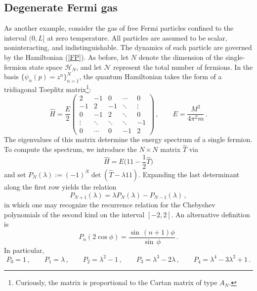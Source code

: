 \documentclass[12pt,a4paper]{article}
\numberwithin{equation}{section}
\theoremstyle{theorem}
\theoremstyle{remark}
\newcommand{\hn}{\mathcal{H}_N}
\newcommand{\I}{1\!\! 1}
\begin{document}
\subsection{Degenerate Fermi gas}

As another example,  consider the gas of free Fermi particles confined to the interval $(0,L]$ at zero temperature. All particles are assumed to be scalar, noninteracting,  and indistinguishable.  The dynamics of each particle are governed by the Hamiltonian (\ref{FP}). As before, let $N$ denote the dimension of the single-fermion state space $\hn$, and let $ \mathcal{N}$ represent the total number of fermions. In the basis $\big\{\psi_n(p)=z^n\big \}_{n=1}^N$, the quantum Hamiltonian takes the form of a tridiagonal Toeplitz matrix\footnote{Curiously, the matrix is proportional to the Cartan matrix of type $A_N$.}:
\begin{equation}\hat H=\frac E2\left(
\begin{array}{cccccc}
     2&-1&0&\cdots&0  \\
     -1&2& -1&\ddots&\vdots\\
     0&-1&2&\ddots &0\\
     \vdots&\ddots&\ddots&\ddots&-1\\
     0&\cdots &0&-1&2
\end{array}\right)\,,\qquad E=\frac{M^2}{4\pi^2 m}\,.
\end{equation}
The eigenvalues of this matrix determine the energy spectrum of a single fermion. To compute the spectrum, we introduce the $N\times N$ matrix $\hat T$ via
\begin{equation}\label{T}
    \hat H= E\big (\I- \frac12 \hat T\big)
\end{equation}
and set $P_N (\lambda):=(-1)^N\det(\hat{T}-\lambda \I)$. Expanding the last determinant along the first row yields the relation 
\begin{equation}
    P_{N+1}(\lambda )=\lambda P_N(\lambda )-P_{N-1}(\lambda )\,,
\end{equation}
in which one may recognize the recurrence relation for the Chebyshev polynomials of the second kind on the interval $[-2,2]$. An alternative definition is 
\begin{equation}\label{CP}
    P_n(2\cos \phi)=\frac{\sin\, (n+1)\phi}{\sin\,\phi}\,.
\end{equation}
In particular,
\begin{equation}
P_0=1\,,\qquad P_1=\lambda\,,\qquad P_2=\lambda^2-1\,,\qquad P_3=\lambda^3-2\lambda\,,\qquad P_4=\lambda^4-3\lambda^2+1\,.
\end{equation}
\end{document}
